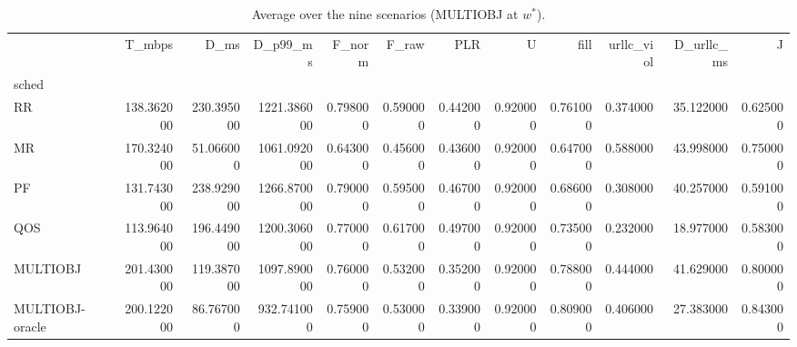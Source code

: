 \begin{table}
\caption{Average over the nine scenarios (MULTIOBJ at $w^*$).}
\label{tab:cmp}
\begin{tabular}{lrrrrrrrrrrr}
\toprule
 & T_mbps & D_ms & D_p99_ms & F_norm & F_raw & PLR & U & fill & urllc_viol & D_urllc_ms & J \\
sched &  &  &  &  &  &  &  &  &  &  &  \\
\midrule
RR & 138.362000 & 230.395000 & 1221.386000 & 0.798000 & 0.590000 & 0.442000 & 0.920000 & 0.761000 & 0.374000 & 35.122000 & 0.625000 \\
MR & 170.324000 & 51.066000 & 1061.092000 & 0.643000 & 0.456000 & 0.436000 & 0.920000 & 0.647000 & 0.588000 & 43.998000 & 0.750000 \\
PF & 131.743000 & 238.929000 & 1266.870000 & 0.790000 & 0.595000 & 0.467000 & 0.920000 & 0.686000 & 0.308000 & 40.257000 & 0.591000 \\
QOS & 113.964000 & 196.449000 & 1200.306000 & 0.770000 & 0.617000 & 0.497000 & 0.920000 & 0.735000 & 0.232000 & 18.977000 & 0.583000 \\
MULTIOBJ & 201.430000 & 119.387000 & 1097.890000 & 0.760000 & 0.532000 & 0.352000 & 0.920000 & 0.788000 & 0.444000 & 41.629000 & 0.800000 \\
MULTIOBJ-oracle & 200.122000 & 86.767000 & 932.741000 & 0.759000 & 0.530000 & 0.339000 & 0.920000 & 0.809000 & 0.406000 & 27.383000 & 0.843000 \\
\bottomrule
\end{tabular}
\end{table}
